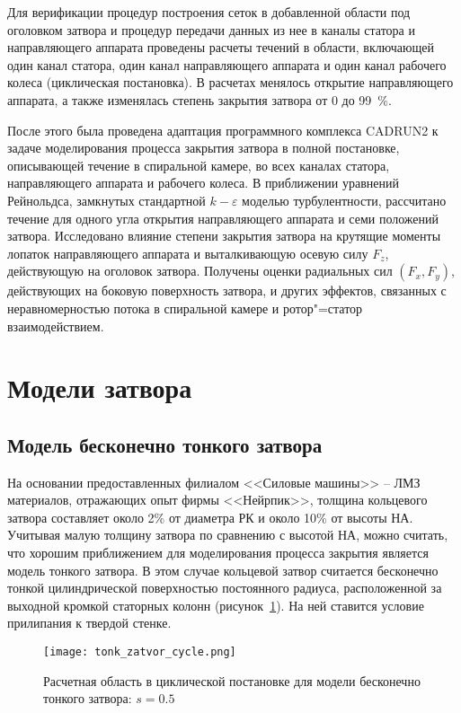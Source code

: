 Для верификации процедур построения сеток в добавленной области под оголовком затвора и процедур передачи 
данных из нее в каналы статора и направляющего аппарата проведены расчеты течений в области, включающей один 
канал статора, один канал направляющего аппарата и один канал рабочего колеса (циклическая постановка). 
В расчетах менялось открытие направляющего аппарата, а также изменялась степень закрытия затвора от 0 до 99~\%.

После этого была проведена адаптация программного комплекса CADRUN2 к задаче моделирования процесса 
закрытия затвора в полной постановке, описывающей течение в спиральной камере, во всех каналах статора, 
направляющего аппарата и рабочего колеса. В приближении уравнений Рейнольдса, замкнутых 
стандартной $k-\varepsilon$ моделью турбулентности, рассчитано течение для одного угла открытия направляющего 
аппарата и семи положений затвора. 
Исследовано влияние степени закрытия затвора на крутящие моменты лопаток направляющего аппарата и 
выталкивающую осевую силу $F_z$, действующую на оголовок затвора. Получены оценки 
радиальных сил $(F_x, F_y)$, действующих на боковую поверхность затвора, и других эффектов, связанных с 
неравномерностью потока в спиральной камере и ротор"=статор взаимодействием. 

\section{Модели затвора}
\label{s:42}
\subsection{Модель бесконечно тонкого затвора}
\label{s:421}
На основании  предоставленных филиалом <<Силовые машины>> -- ЛМЗ материалов, отражающих опыт 
фирмы <<Нейрпик>>, толщина кольцевого затвора составляет около 2\% от диаметра РК и около 10\% от высоты НА. 
Учитывая малую толщину затвора по сравнению с высотой НА, можно считать, что 
хорошим приближением для моделирования процесса закрытия является модель тонкого затвора. В этом случае 
кольцевой затвор считается бесконечно тонкой цилиндрической поверхностью постоянного радиуса, расположенной 
за выходной кромкой статорных колонн (рисунок~\ref{fig:2}). На ней ставится условие 
прилипания к твердой стенке. 
\begin{figure}[!h]
  \centering \texttt{[image: tonk\_zatvor\_cycle.png]}\\  
  \caption{Расчетная область в циклической постановке для модели бесконечно тонкого затвора: $s=0.5$}
  \label{fig:2}
\end{figure}

